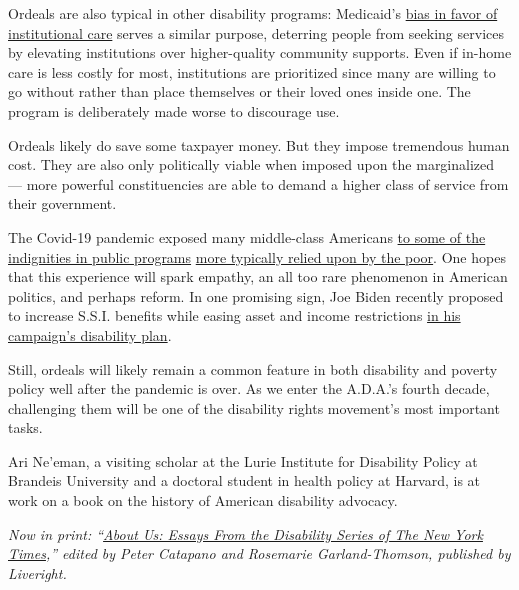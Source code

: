 Ordeals are also typical in other disability programs: Medicaid's
\href{https://readingroom.law.gsu.edu/cgi/viewcontent.cgi?article=2416\&context=gsulr}{bias
in favor of institutional care} serves a similar purpose, deterring
people from seeking services by elevating institutions over
higher-quality community supports. Even if in-home care is less costly
for most, institutions are prioritized since many are willing to go
without rather than place themselves or their loved ones inside one. The
program is deliberately made worse to discourage use.

Ordeals likely do save some taxpayer money. But they impose tremendous
human cost. They are also only politically viable when imposed upon the
marginalized --- more powerful constituencies are able to demand a
higher class of service from their government.

The Covid-19 pandemic exposed many middle-class Americans
\href{https://www.theledger.com/news/20200706/state-feds-probe--jobless-benefits-system-mdash-but-who-will-fix-it}{to
some of the}
\href{https://madison.com/wsj/news/local/govt-and-politics/lives-on-hold-covid-19-pandemic-exposes-failures-of-wisconsin-unemployment-insurance-system/article_96810941-894d-5bb9-9485-16912cb2be57.html}{indignities
in public programs}
\href{https://coronavirus.jhu.edu/from-our-experts/can-the-us-safety-net-handle-the-covid-19-pandemic-and-recession}{more
typically relied upon by the poor}. One hopes that this experience will
spark empathy, an all too rare phenomenon in American politics, and
perhaps reform. In one promising sign, Joe Biden recently proposed to
increase S.S.I. benefits while easing asset and income restrictions
\href{https://joebiden.com/disabilities/}{in his campaign's disability
plan}.

Still, ordeals will likely remain a common feature in both disability
and poverty policy well after the pandemic is over. As we enter the
A.D.A.'s fourth decade, challenging them will be one of the disability
rights movement's most important tasks.

Ari Ne'eman, a visiting scholar at the Lurie Institute for Disability
Policy at Brandeis University and a doctoral student in health policy at
Harvard, is at work on a book on the history of American disability
advocacy.

\emph{Now in print: ``}\href{https://www.aboutusbook.com/}{\emph{About
Us: Essays From the Disability Series of The New York Times}}\emph{,''
edited by Peter Catapano and Rosemarie Garland-Thomson, published by
Liveright.}

